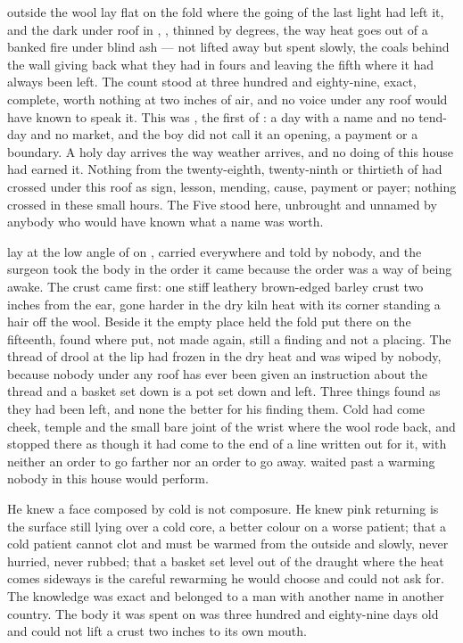 
 outside the wool lay flat on the fold where the going of the last light had left it, and the dark under  roof in , ,  thinned by degrees, the way heat goes out of a banked fire under blind ash --- not lifted away but spent slowly, the coals behind the wall giving back what they had in fours and leaving the fifth where it had always been left. The count stood at three hundred and eighty-nine, exact, complete, worth nothing at two inches of air, and no voice under any roof would have known to speak it. This was , the first of : a day with a name and no tend-day and no market, and the boy did not call it an opening, a payment or a boundary. A holy day arrives the way weather arrives, and no doing of this house had earned it. Nothing from the twenty-eighth, twenty-ninth or thirtieth of  had crossed under this roof as sign, lesson, mending, cause, payment or payer; nothing crossed in these small hours. The Five stood here, unbrought and unnamed by anybody who would have known what a name was worth.

 lay at the low angle of  on , carried everywhere and told by nobody, and the surgeon took the body in the order it came because the order was a way of being awake. The crust came first: one stiff leathery brown-edged barley crust two inches from the ear, gone harder in the dry kiln heat with its corner standing a hair off the wool. Beside it the empty place held the fold put there on the fifteenth, found where put, not made again, still a finding and not a placing. The thread of drool at the lip had frozen in the dry heat and was wiped by nobody, because nobody under any roof has ever been given an instruction about the thread and a basket set down is a pot set down and left. Three things found as they had been left, and none the better for his finding them. Cold had come cheek, temple and the small bare joint of the wrist where the wool rode back, and stopped there as though it had come to the end of a line written out for it, with neither an order to go farther nor an order to go away.  waited past a warming nobody in this house would perform.

He knew a face composed by cold is not composure. He knew pink returning is the surface still lying over a cold core, a better colour on a worse patient; that a cold patient cannot clot and must be warmed from the outside and slowly, never hurried, never rubbed; that a basket set level out of the draught where the heat comes sideways is the careful rewarming he would choose and could not ask for. The knowledge was exact and belonged to a man with another name in another country. The body it was spent on was three hundred and eighty-nine days old and could not lift a crust two inches to its own mouth.


